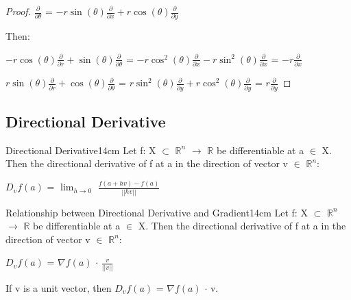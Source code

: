\begin{proof}
        \hspace{0.5cm}
        $\frac{\partial}{\partial \theta}$
        = $-r \sin(\theta) \frac{\partial}{\partial x}
            + r \cos(\theta) \frac{\partial}{\partial y}$

        Then:

        \hspace{0.5cm}
        $-r \cos(\theta) \frac{\partial }{\partial r}
            + \sin(\theta) \frac{\partial}{\partial \theta}$
        = $-r\cos^2(\theta)\frac{\partial }{\partial x}
            -r\sin^2(\theta)\frac{\partial }{\partial x}$
        = $-r \frac{\partial }{\partial x}$

        \hspace{0.5cm}
        $r \sin(\theta) \frac{\partial }{\partial r}
            + \cos(\theta) \frac{\partial}{\partial \theta}$
        = $r\sin^2(\theta)\frac{\partial }{\partial y}
            + r\cos^2(\theta)\frac{\partial }{\partial y}$
        = $r \frac{\partial }{\partial y}$
    \end{proof}

    \vspace{0.5cm}





\subsection{ Directional Derivative }

    \begin{definition}{Directional Derivative}{14cm}
        Let f: X $\subset$ $\mathbb{R}^n$ $\rightarrow$ $\mathbb{R}$
        be differentiable at a $\in$ X.
        Then the {\color{lblue} directional derivative} of f at a
        in the direction of vector v $\in$ $\mathbb{R}^n$:

        \hspace{0.5cm}
        $D_vf(a)$ = $\lim_{h \rightarrow 0}$ $\frac{f(a+hv) - f(a)}{||hv||}$
    \end{definition}

    \vspace{0.5cm}



    \begin{wtheorem}{Relationship between Directional Derivative and Gradient}{14cm}
        Let f: X $\subset$ $\mathbb{R}^n$ $\rightarrow$ $\mathbb{R}$
        be differentiable at a $\in$ X.
        Then the directional derivative of f at a
        in the direction of vector v $\in$ $\mathbb{R}^n$:

        \hspace{0.5cm}
        $D_vf(a)$ = $\nabla f(a)$ $\cdot$ $\frac{v}{||v||}$

        If v is a unit vector, then $D_vf(a)$ = $\nabla f(a)$ $\cdot$ v.
    \end{wtheorem}

